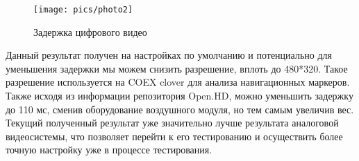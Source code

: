 \begin{figure}[H]
	\centering
	\texttt{[image: pics/photo2]}
	\caption{ Задержка цифрового видео
	}
	\label{fig:photo2}
\end{figure}

Данный результат получен на настройках по умолчанию и потенциально для уменьшения задержки мы можем снизить разрешение, вплоть до 480*320. Такое разрешение используется на COEX clover для анализа навигационных маркеров. Также исходя из информации репозитория Open.HD, можно уменьшить задержку до 110 мс, сменив оборудование воздушного модуля, но тем самым увеличив вес. 
Текущий полученный результат уже значительно лучше результата аналоговой видеосистемы, что позволяет перейти к его тестированию и осуществить более точную настройку уже в процессе тестирования.